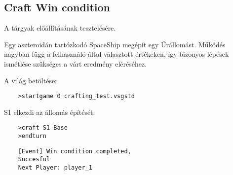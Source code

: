 \documentclass[../../projlab]{subfiles}
\begin{document}
\subsection{Craft Win condition}
\begin{test-case-description}
    A tárgyak előállításának tesztelésére.
\end{test-case-description}
\begin{test-case-function}
    Egy aszteroidán tartózkodó SpaceShip megépít egy Űrállomást. \newline
    Működés nagyban függ a felhasználó által választott értékeken, így bizonyos lépések ismétlése szükséges a várt eredmény eléréséhez.
\end{test-case-function}
\begin{test-case-input}

    A világ betöltése: 
    \begin{verbatim}
    >startgame 0 crafting_test.vsgstd
    \end{verbatim}
    S1 elkezdi az állomás építését:
    \begin{verbatim}
    >craft S1 Base
    >endturn
    \end{verbatim}
\end{test-case-input}
\begin{test-case-output}
\begin{verbatim}
    [Event] Win condition completed,
    Succesful
    Next Player: player_1
\end{verbatim}
\end{test-case-output}
\end{document}
